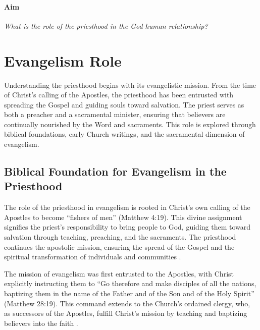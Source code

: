\documentclass[12pt,doc]{apa7}   	%
\begin{document}
\vskip 0.5cm
\paragraph{Aim}  \emph{What is the role of the priesthood in the God-human relationship?}

\section{Evangelism Role}\label{evangelism}
Understanding the priesthood begins with its evangelistic mission. From the time of Christ’s calling of the Apostles, the priesthood has been entrusted with spreading the Gospel and guiding souls toward salvation. The priest serves as both a preacher and a sacramental minister, ensuring that believers are continually nourished by the Word and sacraments. This role is explored through biblical foundations, early Church writings, and the sacramental dimension of evangelism.

\subsection{Biblical Foundation for Evangelism in the Priesthood}
The role of the priesthood in evangelism is rooted in Christ’s own calling of the Apostles to become “fishers of men” (Matthew 4:19). This divine assignment signifies the priest’s responsibility to bring people to God, guiding them toward salvation through teaching, preaching, and the sacraments. The priesthood continues the apostolic mission, ensuring the spread of the Gospel and the spiritual transformation of individuals and communities \citep{complete_work_chrysostom}.

The mission of evangelism was first entrusted to the Apostles, with Christ explicitly instructing them to “Go therefore and make disciples of all the nations, baptizing them in the name of the Father and of the Son and of the Holy Spirit” (Matthew 28:19). This command extends to the Church’s ordained clergy, who, as successors of the Apostles, fulfill Christ’s mission by teaching and baptizing believers into the faith \citep{complete_work_chrysostom}.
\end{document}
